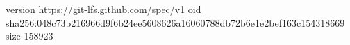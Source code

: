 version https://git-lfs.github.com/spec/v1
oid sha256:048c73b216966d9f6b24ee5608626a16060788db72b6e1e2bef163c154318669
size 158923
